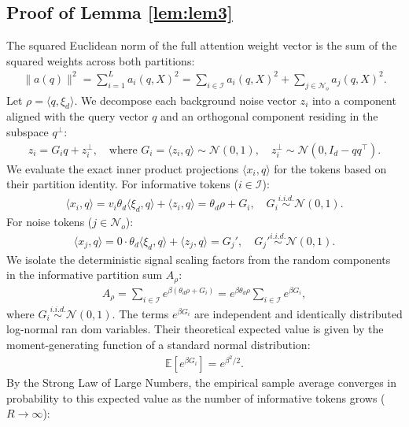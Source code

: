 \documentclass[11pt,a4paper]{article}
\theoremstyle{definition}
\begin{document}
\subsection{Proof of  Lemma \ref{lem:lem3}}
The squared Euclidean norm of the full attention weight vector is the sum of the squared weights across both partitions:
\begin{align}
\|a(q)\|^2 = \sum_{i=1}^L a_i(q, X)^2 = \sum_{i \in \mathcal{I}} a_i(q, X)^2 + \sum_{j \in \mathcal{N}_o} a_j(q, X)^2 \label{P0}.
\end{align}
Let $\rho = \langle q, \xi_d \rangle$. We decompose each background noise vector $z_i$ into a component aligned with the query vector $q$ and an orthogonal component residing in the subspace $q^\perp$:
\begin{align}
z_i = G_i q + z_i^\perp, \quad \text{where } G_i = \langle z_i, q \rangle \sim \mathcal{N}(0,1), \quad z_i^\perp \sim \mathcal{N}(0, I_d - q q^\top).
\end{align}
We evaluate the exact inner product projections $\langle x_i, q \rangle$ for the tokens based on their partition identity. For informative tokens ($i \in \mathcal{I}$):
\begin{align}
\langle x_i, q \rangle = v_i \theta_d \langle \xi_d, q \rangle + \langle z_i, q \rangle = \theta_d \rho + G_i, \quad G_i \overset{i.i.d.}{\sim} \mathcal{N}(0,1).
\end{align}
For noise tokens ($j \in \mathcal{N}_o$):
\begin{align}
\langle x_j, q \rangle = 0 \cdot \theta_d \langle \xi_d, q \rangle + \langle z_j, q \rangle = G_j', \quad G_j' \overset{i.i.d.}{\sim} \mathcal{N}(0,1).
\end{align}
 We isolate the deterministic signal scaling factors from the random components in the informative partition sum $A_{\rho}$:
\begin{align}
A_{\rho} = \sum_{i \in \mathcal{I}} e^{\beta (\theta_d \rho + G_i)} = e^{\beta \theta_d \rho} \sum_{i \in \mathcal{I}} e^{\beta G_i} \label{eq73},
\end{align}
where $G_i \overset{i.i.d.}{\sim} \mathcal{N}(0,1)$. The terms $e^{\beta G_i}$ are independent and identically distributed log-normal ran
dom variables. Their theoretical expected value is given by the moment-generating function of a standard normal distribution:
\begin{align}
\mathbb{E}\left[ e^{\beta G_i} \right] = e^{\beta^2 / 2} \label{eq75}.
\end{align}
By the Strong Law of Large Numbers, the empirical sample average converges in probability to this expected value as the number of informative tokens grows ($R \rightarrow \infty$):
\end{document}
